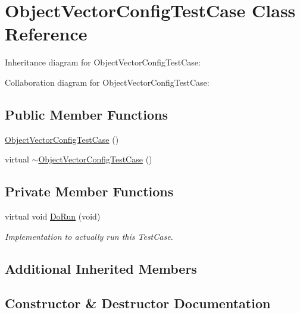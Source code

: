 \hypertarget{classObjectVectorConfigTestCase}{}\section{Object\+Vector\+Config\+Test\+Case Class Reference}
\label{classObjectVectorConfigTestCase}


Inheritance diagram for Object\+Vector\+Config\+Test\+Case\+:


Collaboration diagram for Object\+Vector\+Config\+Test\+Case\+:
\subsection*{Public Member Functions}
\begin{DoxyCompactItemize}
\item 
\hyperlink{classObjectVectorConfigTestCase_a38628332c9f122c34d35003314c1c235}{Object\+Vector\+Config\+Test\+Case} ()
\item 
virtual \hyperlink{classObjectVectorConfigTestCase_adf4060e04e5a68a25e3f76c2f9f601a6}{$\sim$\+Object\+Vector\+Config\+Test\+Case} ()
\end{DoxyCompactItemize}
\subsection*{Private Member Functions}
\begin{DoxyCompactItemize}
\item 
virtual void \hyperlink{classObjectVectorConfigTestCase_aa573c18d1d29e49054b1ec4905e0d586}{Do\+Run} (void)
\begin{DoxyCompactList}\small\item\em Implementation to actually run this Test\+Case. \end{DoxyCompactList}\end{DoxyCompactItemize}
\subsection*{Additional Inherited Members}


\subsection{Constructor \& Destructor Documentation}
